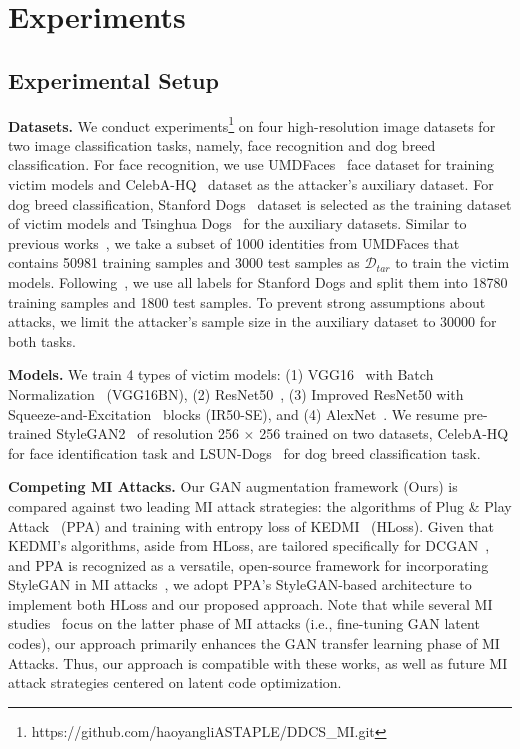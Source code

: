 \section{Experiments}
\label{sec:exp}
\subsection{Experimental Setup}
\noindent
\textbf{Datasets.}\quad
We conduct experiments\footnote{https://github.com/haoyangliASTAPLE/DDCS\_MI.git} on four high-resolution image datasets for two image classification tasks, namely, face recognition and dog breed classification.
For face recognition, we use UMDFaces~\cite{umdfaces} face dataset for training victim models and CelebA-HQ~\cite{pgan18iclr,celeba} dataset as the attacker's auxiliary dataset.
For dog breed classification, Stanford Dogs~\cite{stanforddogs} dataset is selected as the training dataset of victim models and Tsinghua Dogs~\cite{tsinghuadogs20} for the auxiliary datasets.
Similar to previous works~\cite{kedmi21iccv, gmi20cvpr}, we take a subset of 1000 identities from UMDFaces that contains 50981 training samples and 3000 test samples as $\mathcal{D}_{tar}$ to train the victim models.
Following~\cite{ppa22icml}, we use all labels for Stanford Dogs and split them into 18780 training samples and 1800 test samples.
To prevent strong assumptions about attacks, we limit the attacker's sample size in the auxiliary dataset to 30000 for both tasks.

\noindent
\textbf{Models.}\quad
We train 4 types of victim models: (1) VGG16~\cite{vgg} with Batch Normalization~\cite{bn} (VGG16BN), (2) ResNet50~\cite{resnet}, (3) Improved ResNet50 with Squeeze-and-Excitation~\cite{se18cvpr} blocks (IR50-SE), and (4) AlexNet~\cite{alexnet}.
We resume pre-trained StyleGAN2~\cite{stylegan2_20cvpr} of resolution 256 $\times$ 256 trained on two datasets, CelebA-HQ for face identification task and LSUN-Dogs~\cite{lsun} for dog breed classification task.



\noindent
\textbf{Competing MI Attacks.}\quad
Our GAN augmentation framework (Ours) is compared against two leading MI attack strategies: the algorithms of Plug \& Play Attack~\cite{ppa22icml} (PPA) and training with entropy loss of KEDMI~\cite{kedmi21iccv} (HLoss).
Given that KEDMI's algorithms, aside from HLoss, are tailored specifically for DCGAN~\cite{ppa22icml}, and PPA is recognized as a versatile, open-source framework for incorporating StyleGAN in MI attacks~\cite{ppa22icml,mi23mm}, we adopt PPA's StyleGAN-based architecture to implement both HLoss and our proposed approach.
Note that while several MI studies~\cite{gmi20cvpr,mirror22ndss,vmi21nips,rethink23cvpr,mi23mm} focus on the latter phase of MI attacks (i.e., fine-tuning GAN latent codes), our approach primarily enhances the GAN transfer learning phase of MI Attacks.
Thus, our approach is compatible with these works, as well as future MI attack strategies centered on latent code optimization.

